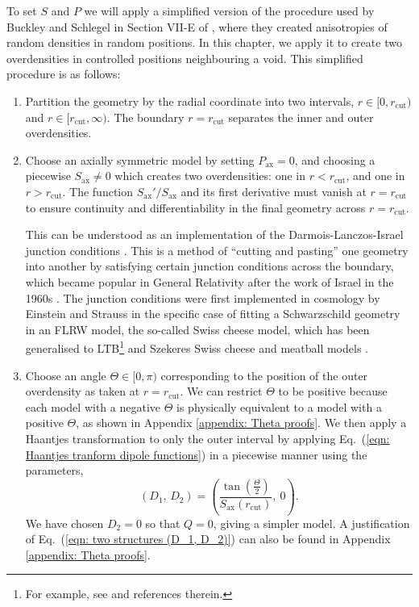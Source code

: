\documentclass[a4paper,12pt]{report}
\renewcommand{\eqref}[1]{Eq.~({#1})}
\begin{document}
To set $S$ and $P$ we will apply a simplified version of the procedure used by Buckley and Schlegel in Section VII-E of \cite{RN1}, where they created anisotropies of random densities in random positions. In this chapter, we apply it to create two overdensities in controlled positions neighbouring a void. This simplified procedure is as follows:
\begin{enumerate}
    \item Partition the geometry by the radial coordinate into two intervals, $r \in [0, r_{\text{cut}})$ and $r \in [r_{\text{cut}}, \infty)$. The boundary $r=r_\text{cut}$ separates the inner and outer overdensities.

    \item Choose an axially symmetric model by setting $P_{\text{ax}}=0$, and choosing a piecewise $S_{\text{ax}} \neq 0$ which creates two overdensities: one in $r<r_{\text{cut}}$, and one in $r>r_{\text{cut}}$. The function $S_{\text{ax}}'/S_{\text{ax}}$ and its first derivative must vanish at $r=r_{\text{cut}}$ to ensure continuity and differentiability in the final geometry across $r=r_{\text{cut}}$.

    This can be understood as an implementation of the Darmois-Lanczos-Israel junction conditions \cite{RN245,RN242}. This is a method of ``cutting and pasting'' one geometry into another by satisfying certain junction conditions across the boundary, which became popular in General Relativity after the work of Israel in the 1960s \cite{RN242}. The junction conditions were first implemented in cosmology by Einstein and Strauss \cite{RN248,RN249} in the specific case of fitting a Schwarzschild geometry in an FLRW model, the so-called Swiss cheese model, which has been generalised to LTB\footnote{For example, see \cite{RN254} and references therein.} and Szekeres Swiss cheese \cite{RN252,RN142,RN141,RN253,RN7} and meatball models \cite{RN140}.

    \item Choose an angle $\Theta \in [0,\pi)$ corresponding to the position of the outer overdensity as taken at $r=r_{\text{cut}}$. We can restrict $\Theta$ to be positive because each model with a negative $\Theta$ is physically equivalent to a model with a positive $\Theta$, as shown in Appendix \ref{appendix: Theta proofs}. We then apply a Haantjes transformation to only the outer interval by applying \eqref{\ref{eqn: Haantjes tranform dipole functions}} in a piecewise manner using the parameters,
    \begin{equation}\label{eqn: two structures (D_1, D_2)}
        (D_1,\, D_2) = \left(\frac{\tan \left(\frac{\Theta}{2}\right)}{S_\text{ax} (r_\text{cut})},\: 0\right).
    \end{equation}
    We have chosen $D_2=0$ so that $Q=0$, giving a simpler model. A justification of \eqref{\ref{eqn: two structures (D_1, D_2)}} can also be found in Appendix \ref{appendix: Theta proofs}.


\end{enumerate}
\end{document}
